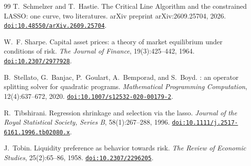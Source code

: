 \documentclass[11pt]{article}
\begin{document}
\begin{thebibliography}{99}
T.~Schmelzer and T.~Hastie.
\newblock The Critical Line Algorithm and the constrained LASSO: one curve, two
literatures.
\newblock arXiv preprint arXiv:2609.25704, 2026.
\newblock \href{https://doi.org/10.48550/arXiv.2609.25704}{\texttt{doi:10.48550/arXiv.2609.25704}}.

W.~F. Sharpe.
\newblock Capital asset prices: a theory of market equilibrium under conditions of risk.
\newblock \emph{The Journal of Finance}, 19(3):425--442, 1964.
\newblock \href{https://doi.org/10.2307/2977928}{\texttt{doi:10.2307/2977928}}.

B.~Stellato, G.~Banjac, P.~Goulart, A.~Bemporad, and S.~Boyd.
: an operator splitting solver for quadratic programs.
\newblock \emph{Mathematical Programming Computation}, 12(4):637--672, 2020.
\newblock \href{https://doi.org/10.1007/s12532-020-00179-2}{\texttt{doi:10.1007/s12532-020-00179-2}}.

R.~Tibshirani.
\newblock Regression shrinkage and selection via the lasso.
\newblock \emph{Journal of the Royal Statistical Society, Series B}, 58(1):267--288,
1996.
\newblock \href{https://doi.org/10.1111/j.2517-6161.1996.tb02080.x}{\texttt{doi:10.1111/j.2517-6161.1996.tb02080.x}}.

J.~Tobin.
\newblock Liquidity preference as behavior towards risk.
\newblock \emph{The Review of Economic Studies}, 25(2):65--86, 1958.
\newblock \href{https://doi.org/10.2307/2296205}{\texttt{doi:10.2307/2296205}}.

\end{thebibliography}
\end{document}
